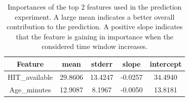 \begin{table}[t!]
\begin{center}
\scriptsize
\caption {Importances of the top 2 features used in the prediction experiment. A large mean indicates a better overall contribution to the prediction. A positive slope indicates that the feature is gaining in importance when the considered time window increases.}
\begin{tabular}{|c|c|c|c|c|}
\hline
Feature              & mean      & stderr    & slope     & intercept \\
\hline
HIT\_available      & 29.8606 & 13.4247 & -0.0257 & 34.4940 \\
Age_minutes           & 12.9087 &  8.1967 & -0.0050 & 13.8181 \\

\end{tabular}
\end{center}
\end{table}
